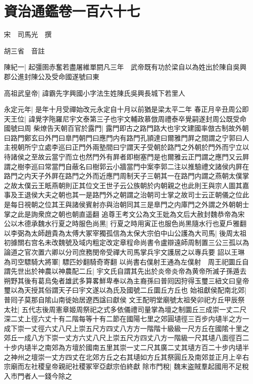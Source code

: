 \chapter{資治通鑑卷一百六十七}
宋　司馬光　撰

胡三省　音註

陳紀一|{
	起彊圉赤奮若盡屠維單閼凡三年　武帝既有功於梁自以為姓出於陳自吳興郡公進封陳公及受命國遂號曰東}


高祖武皇帝|{
	諱霸先字興國小字法生姓陳氏吳興長城下若里人}


永定元年|{
	是年十月受禪始改元永定自十月以前猶是梁太平二年}
春正月辛丑周公即天王位|{
	諱覺字陁羅尼宇文泰第三子也宇文輔政慕倣周禮泰卒覺嗣遂封周公既受命國號曰周}
柴燎告天朝百官於露門|{
	露門即古之路門路大也宇文建國率倣古制故外朝曰路門鄭玄曰外門曰臯門朝門曰應門内有路門孔頴達曰爾雅門屛之間謂之宁郭曰人主視朝所宁立處李巡曰正門外兩塾間曰宁謂天子受朝於路門之外朝於門外而宁立以待諸侯之至故云當宁而立也然門外有屛者即樹塞門是也爾雅云正門謂之應門又云屛謂之樹李巡曰常當門自蔽名曰樹郭云小牆當門中案李郭二注以推驗禮文諸侯内屛在路門之内天子外屛在路門之外而近應門周制天子三朝其一在路門内謂之燕朝太僕掌之故太僕云王眂燕朝則正其位文王世子云公族朝於内朝親之也此則王與宗人圖其嘉事及王退侯大夫之朝也其一是路門外之朝謂之治朝司士掌之故司士云正朝儀之位此是每日視朝之位其王與諸侯賓射亦與治朝同其三是臯門之内庫門之外謂之外朝朝士掌之此是詢衆庶之朝也朝直遥翻}
追尊王考文公為文王妣為文后大赦封魏恭帝為宋公以木德承魏水行夏之時服色尚黑|{
	行夏之時用寅正也服色尚黑隨水行也夏戶雅翻}
以李弼為太師趙貴為太傅大冢宰獨孤信為太保大宗伯中山公護為大司馬|{
	後周太祖初據關右宫名未改魏號及域内粗定改定章程命尚書令盧辯遠師周制置三公三孤以為論道之官次置六卿以分司庶務閔帝受禪大司馬掌兵宇文護居之以專兵要}
詔以王琳為司空驃騎大將軍|{
	驃匹妙翻騎奇寄翻}
以尚書右僕射王通為左僕射　周王祀圜丘自謂先世出於神農以神農配二丘|{
	宇文氏自謂其先出於炎帝炎帝為黄帝所滅子孫遁去朔野其後有葛烏兔者雄武多算畧鮮卑奉以為主裔孫曰普囘因狩得玉璽三紐文曰皇帝璽以為天授其俗謂天子曰宇文遂以為氏及國號二丘圜丘方丘也}
始祖獻侯配南北郊|{
	普囘子莫那自隂山南徙始居遼西諡曰獻侯}
文王配明堂廟號太祖癸卯祀方丘甲辰祭太社|{
	五代志後周憲章姬周祭祀之式多依儀禮司量掌為壇之制圜丘三成崇一丈二尺深二丈上徑六丈十有二階每等十有二節在國陽七里之郊圓壝徑三百步内壝半之方一成下崇一丈徑六丈八尺上崇五尺方四丈八方方一階階十級級一尺方丘在國隂十里之郊丘一成八方下崇一丈方六丈八尺上崇五尺方四丈八方一階級一尺其壝八面徑百二十步内壝半之南郊為方壇於國南五里其崇一丈二尺其廣二丈其壝方百二十步内壝半之神州之壇崇一丈方四丈在北郊方丘之右其壝如方丘其祭圓丘及南郊並正月上辛右宗廟而左社稷皇帝親祀社稷冢宰亞獻宗伯終獻}
除市門稅|{
	魏末盗賊羣起國用不足稅入市門者人一錢今除之}
